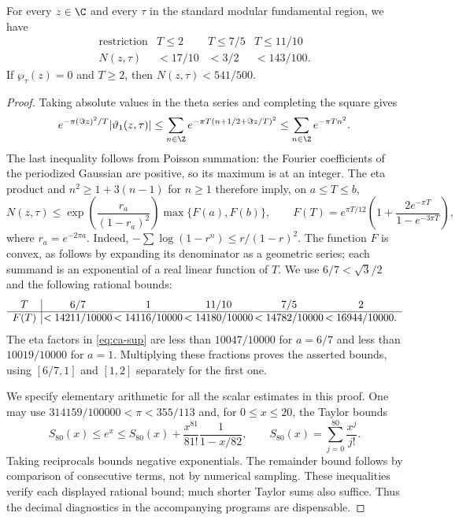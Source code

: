 \begin{statement}
For every $z\in\C$ and every $\tau$ in the standard modular
fundamental region, we have
\[
 \begin{array}{c|ccc}
 \text{restriction}&T\le2&T\le7/5&T\le11/10\\ \hline
 N(z,\tau)&<17/10&<3/2&<143/100.
 \end{array}
\]
If $\wp_\tau(z)=0$ and $T\ge2$, then $N(z,\tau)<541/500$.
\end{statement}
\begin{proof}
Taking absolute values in the theta series and completing the square
gives
\[
 e^{-\pi(\Im z)^2/T}|\vartheta_1(z,\tau)|
 \le\sum_{n\in\Z}
 e^{-\pi T(n+1/2+\Im z/T)^2}
 \le\sum_{n\in\Z}e^{-\pi Tn^2}.
\]
The last inequality follows from Poisson summation: the Fourier
coefficients of the periodized Gaussian are positive, so its maximum
is at an integer. The eta product and $n^2\ge1+3(n-1)$ for $n\ge1$
therefore imply, on $a\le T\le b$,
\begin{equation}\label{eq:ca-sup}
 N(z,\tau)\le
 \exp\!\left(\frac{r_a}{(1-r_a)^2}\right)
 \max\{F(a),F(b)\},\qquad
 F(T)=e^{\pi T/12}
 \left(1+\frac{2e^{-\pi T}}{1-e^{-3\pi T}}\right),
\end{equation}
where $r_a=e^{-2\pi a}$. Indeed,
$-\sum\log(1-r^n)\le r/(1-r)^2$. The function $F$ is convex,
as follows by expanding its denominator as a geometric series;
each summand is an exponential of a real linear function of $T$.
We use $6/7<\sqrt3/2$ and the following rational bounds:
\[
\begin{array}{c|@{\,}c@{\,}c@{\,}c@{\,}c@{\,}c}
T&6/7&1&11/10&7/5&2\\ \hline
F(T)&<14211/10000&<14116/10000&<14180/10000&<14782/10000&<16944/10000.
\end{array}
\]
The eta factors in \eqref{eq:ca-sup} are less than $10047/10000$
for $a=6/7$ and less than $10019/10000$ for $a=1$.
Multiplying these fractions proves the asserted bounds, using
$[6/7,1]$ and $[1,2]$ separately for the first one.

We specify elementary arithmetic for all the scalar estimates in
this proof. One may use $314159/100000<\pi<355/113$ and, for
$0\le x\le20$, the Taylor bounds
\begin{equation}\label{eq:ca-exp}
 S_{80}(x)\le e^x\le
 S_{80}(x)+\frac{x^{81}}{81!}\frac1{1-x/82},
 \qquad S_{80}(x)=\sum_{j=0}^{80}\frac{x^j}{j!}.
\end{equation}
Taking reciprocals bounds negative exponentials. The remainder
bound follows by comparison of consecutive terms, not by numerical
sampling. These inequalities verify each displayed rational bound;
much shorter Taylor sums also suffice. Thus the decimal diagnostics
in the accompanying programs are dispensable.


\end{proof}
